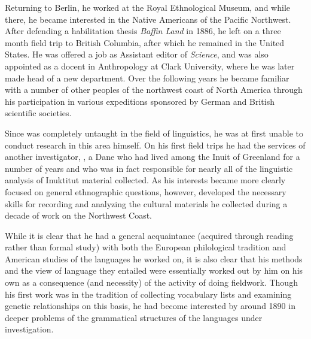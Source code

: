 Returning to Berlin, he worked at the Royal Ethnological Museum, and
while there, he became interested in the Native Americans of the
Pacific Northwest. After defending a habilitation thesis
\textsl{Baffin Land} in 1886, he left on a three month field trip to
British Columbia, after which he remained in the United States. He was
offered a job as Assistant editor of \textsl{Science}, and was also
appointed as a docent in Anthropology at Clark University, where he
was later made head of a new department.  Over the following years he
became familiar with a number of other peoples of the northwest coast
of North America through his participation in various expeditions
sponsored by {German} and British scientific societies.

Since {\Boas} was completely untaught in the field of linguistics, he was
at first unable to conduct research in this area himself. On his first
field trips he had the services of another investigator, , a
Dane who had lived among the Inuit of Greenland for a number of years
and who was in fact responsible for nearly all of the linguistic
analysis of Inuktitut material collected. As his interests became more
clearly focused on general ethnographic questions, however, {\Boas}
developed the necessary skills for recording and analyzing the
cultural materials he collected during a decade of work on the
Northwest Coast.

While it is clear that he had a general acquaintance (acquired through
reading rather than formal study) with both the European philological
tradition and American studies of the languages he worked on, it is
also clear that his methods and the view of language they entailed
were essentially worked out by him on his own as a consequence (and
necessity) of the activity of doing fieldwork. Though his first work
was in the tradition of collecting vocabulary lists and examining
genetic relationships on this basis, he had become interested by
around 1890 in deeper problems of the grammatical structures of the
languages under investigation.

